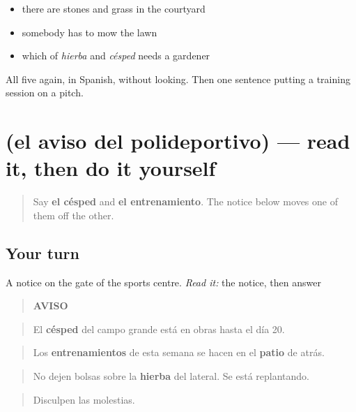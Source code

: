 \begin{itemize}
\raggedright
  \item there are stones and grass in the courtyard
  \item somebody has to mow the lawn
  \item which of \emph{hierba} and \emph{césped} needs a gardener
\end{itemize}

\begin{tcolorbox}[breakable,colback=teal!4,colframe=teal!35!black,title={Before you move on}]
All five again, in Spanish, without looking. Then one sentence putting a training session on a pitch.
\end{tcolorbox}
\section[Practice]{(el aviso del polideportivo) — read it, then do it yourself}

\label{lesson:ES-C450-sintesis-suelo}



\begin{quote}
Say \textbf{el césped} and \textbf{el entrenamiento}. The notice below moves one of them off the other.
\end{quote}

\subsection*{Your turn}
A notice on the gate of the sports centre. \emph{Read it:} the notice, then answer

\begin{quote}
\textbf{AVISO}
\end{quote}

\begin{quote}
El \textbf{césped} del campo grande está en obras hasta el día 20.
\end{quote}

\begin{quote}
Los \textbf{entrenamientos} de esta semana se hacen en el \textbf{patio} de atrás.
\end{quote}

\begin{quote}
No dejen bolsas sobre la \textbf{hierba} del lateral. Se está replantando.
\end{quote}

\begin{quote}
Disculpen las molestias.
\end{quote}


